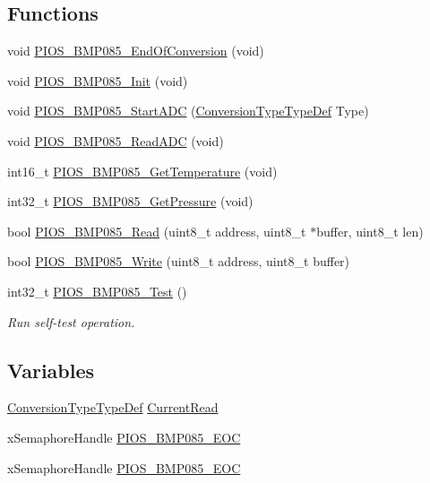 \subsection*{\-Functions}
\begin{DoxyCompactItemize}
\item 
void \hyperlink{group___p_i_o_s___b_m_p085_ga10dbc872cbdcc5069ec1b54bd08c8bba}{\-P\-I\-O\-S\-\_\-\-B\-M\-P085\-\_\-\-End\-Of\-Conversion} (void)
\item 
void \hyperlink{group___p_i_o_s___b_m_p085_gadf378990e49a77f5d07c537d6421d4b3}{\-P\-I\-O\-S\-\_\-\-B\-M\-P085\-\_\-\-Init} (void)
\item 
void \hyperlink{group___p_i_o_s___b_m_p085_gac2f3a7e293bc2263af4dad0a1ca21d51}{\-P\-I\-O\-S\-\_\-\-B\-M\-P085\-\_\-\-Start\-A\-D\-C} (\hyperlink{group___p_i_o_s___b_m_p085_ga9cea215e6c64f123b3561819d5219785}{\-Conversion\-Type\-Type\-Def} \-Type)
\item 
void \hyperlink{group___p_i_o_s___b_m_p085_gae4ba8dc8cb3bda6b4ca92c4c70049e4e}{\-P\-I\-O\-S\-\_\-\-B\-M\-P085\-\_\-\-Read\-A\-D\-C} (void)
\item 
int16\-\_\-t \hyperlink{group___p_i_o_s___b_m_p085_ga5f409188609c693a05e083aeb468907f}{\-P\-I\-O\-S\-\_\-\-B\-M\-P085\-\_\-\-Get\-Temperature} (void)
\item 
int32\-\_\-t \hyperlink{group___p_i_o_s___b_m_p085_ga7aab68a5108a124046196c3f737f1c98}{\-P\-I\-O\-S\-\_\-\-B\-M\-P085\-\_\-\-Get\-Pressure} (void)
\item 
bool \hyperlink{group___p_i_o_s___b_m_p085_ga3bc6ca92960659541d0879b831b6585c}{\-P\-I\-O\-S\-\_\-\-B\-M\-P085\-\_\-\-Read} (uint8\-\_\-t address, uint8\-\_\-t $\ast$buffer, uint8\-\_\-t len)
\item 
bool \hyperlink{group___p_i_o_s___b_m_p085_ga370cd53ce7074cb090f5231ba1644914}{\-P\-I\-O\-S\-\_\-\-B\-M\-P085\-\_\-\-Write} (uint8\-\_\-t address, uint8\-\_\-t buffer)
\item 
int32\-\_\-t \hyperlink{group___p_i_o_s___b_m_p085_ga63112f7f2415c114d2c9042c1b3e8441}{\-P\-I\-O\-S\-\_\-\-B\-M\-P085\-\_\-\-Test} ()
\begin{DoxyCompactList}\small\item\em \-Run self-\/test operation. \end{DoxyCompactList}\end{DoxyCompactItemize}
\subsection*{\-Variables}
\begin{DoxyCompactItemize}
\item 
\hyperlink{group___p_i_o_s___b_m_p085_ga9cea215e6c64f123b3561819d5219785}{\-Conversion\-Type\-Type\-Def} \hyperlink{group___p_i_o_s___b_m_p085_ga1dd45e20832bd6d56c5bcc1b1773a204}{\-Current\-Read}
\item 
x\-Semaphore\-Handle \hyperlink{group___p_i_o_s___b_m_p085_ga4dd7fe8ef562b12c78ad0cfc1bf1fd8e}{\-P\-I\-O\-S\-\_\-\-B\-M\-P085\-\_\-\-E\-O\-C}
\item 
x\-Semaphore\-Handle \hyperlink{group___p_i_o_s___b_m_p085_ga4dd7fe8ef562b12c78ad0cfc1bf1fd8e}{\-P\-I\-O\-S\-\_\-\-B\-M\-P085\-\_\-\-E\-O\-C}
\end{DoxyCompactItemize}


